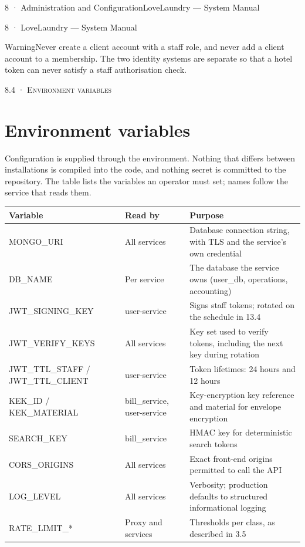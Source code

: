 \documentclass[11pt,a4paper,oneside]{book}
\begin{document}
8 · Administration and ConfigurationLoveLaundry — System Manual

8 · LoveLaundry — System Manual

\begin{notebox}WarningNever create a client account with a staff role, and never add a client account to a membership. The two identity systems are separate so that a hotel token can never satisfy a staff authorisation check.\end{notebox}
\textsc{\small\color{crimson}8.4 · Environment variables}\par\medskip
\section*{Environment variables}
Configuration is supplied through the environment. Nothing that differs between installations is compiled into the code, and nothing secret is committed to the repository. The table lists the variables an operator must set; names follow the service that reads them.

\begin{center}\small
\begin{tabularx}{\linewidth}{|X|X|X|}
\hline
\rowcolor{lightgrey}
\textbf{Variable} & \textbf{Read by} & \textbf{Purpose} \\ \hline
MONGO\_URI & All services & Database connection string, with TLS and the service's own credential \\ \hline
DB\_NAME & Per service & The database the service owns (user\_db, operations, accounting) \\ \hline
JWT\_SIGNING\_KEY & user-service & Signs staff tokens; rotated on the schedule in 13.4 \\ \hline
JWT\_VERIFY\_KEYS & All services & Key set used to verify tokens, including the next key during rotation \\ \hline
JWT\_TTL\_STAFF / JWT\_TTL\_CLIENT & user-service & Token lifetimes: 24 hours and 12 hours \\ \hline
KEK\_ID / KEK\_MATERIAL & bill\_service, user-service & Key-encryption key reference and material for envelope encryption \\ \hline
SEARCH\_KEY & bill\_service & HMAC key for deterministic search tokens \\ \hline
CORS\_ORIGINS & All services & Exact front-end origins permitted to call the API \\ \hline
LOG\_LEVEL & All services & Verbosity; production defaults to structured informational logging \\ \hline
RATE\_LIMIT\_* & Proxy and services & Thresholds per class, as described in 3.5 \\ \hline
\end{tabularx}
\end{center}
\end{document}
